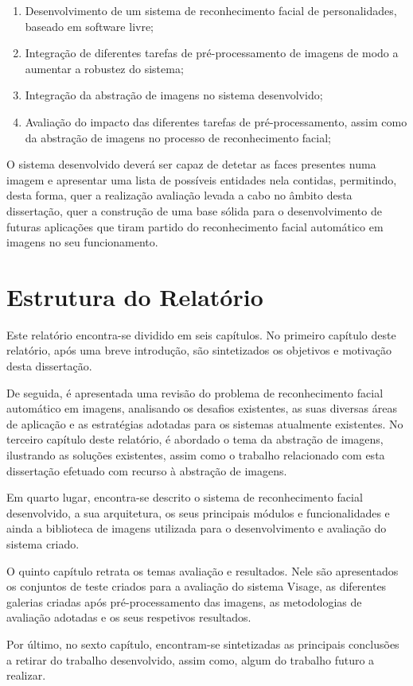 \begin{enumerate}
\item Desenvolvimento de um sistema de reconhecimento facial de personalidades, baseado em software livre;
\item Integração de diferentes tarefas de pré-processamento de imagens de modo a aumentar a robustez do sistema;
\item Integração da abstração de imagens no sistema desenvolvido;
\item Avaliação do impacto das diferentes tarefas de pré-processamento, assim como da abstração de imagens no processo de reconhecimento facial;
\end{enumerate}

O sistema desenvolvido deverá ser capaz de detetar as faces presentes numa imagem e apresentar uma lista de possíveis entidades nela contidas, permitindo, desta forma, quer a realização avaliação levada a cabo no âmbito desta dissertação, quer a construção de uma base sólida para o desenvolvimento de futuras aplicações que tiram partido do reconhecimento facial automático em imagens no seu funcionamento.

\section{Estrutura do Relatório} \label{sec:struct}
Este relatório encontra-se dividido em seis capítulos. No primeiro capítulo deste relatório, após uma breve introdução, são sintetizados os objetivos e motivação desta dissertação.

De seguida, é apresentada uma revisão do problema de reconhecimento facial automático em imagens, analisando os desafios existentes, as suas diversas áreas de aplicação e as estratégias adotadas para os sistemas atualmente existentes. No terceiro capítulo deste relatório, é abordado o tema da abstração de imagens, ilustrando as soluções existentes, assim como o trabalho relacionado com esta dissertação efetuado com  recurso à abstração de imagens.

Em quarto lugar, encontra-se descrito o sistema de reconhecimento facial desenvolvido, a sua arquitetura, os seus principais módulos e funcionalidades e ainda a biblioteca de imagens utilizada para o desenvolvimento e avaliação do sistema criado.

O quinto capítulo retrata os temas avaliação e resultados. Nele são apresentados os conjuntos de teste criados para a avaliação do sistema Visage, as diferentes galerias criadas após pré-processamento das imagens, as metodologias de avaliação adotadas e os seus respetivos resultados.

Por último, no sexto capítulo, encontram-se sintetizadas as principais conclusões a retirar do trabalho desenvolvido, assim como, algum do trabalho futuro a realizar.